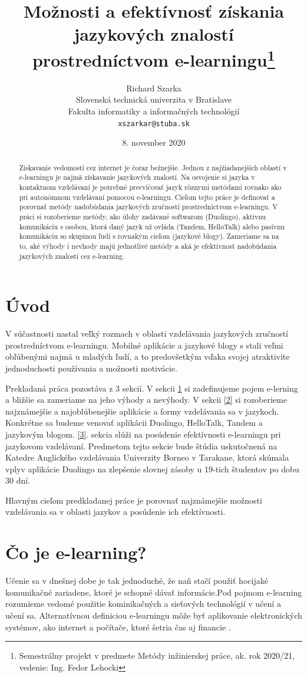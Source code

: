 \documentclass[10pt,oneside,slovak,a4paper]{article}
\title{Možnosti a efektívnosť získania jazykových znalostí prostredníctvom
e-learningu\thanks{Semestrálny projekt v predmete Metódy inžinierskej práce, ak. rok 2020/21, vedenie: Ing. Fedor Lehocki }} %
\author{Richard Szarka\\[2pt]
	{\small Slovenská technická univerzita v Bratislave}\\
	{\small Fakulta informatiky a informačných technológií}\\
	{\small \texttt{xszarkar@stuba.sk}}
	}
\date{\small 8. november 2020} %
\begin{document}
\maketitle

\begin{abstract}
Získavanie vedomostí cez internet je čoraz bežnejšie. Jednou z najžiadanejších oblastí v e-learningu je najmä získavanie jazykových znalostí. Na osvojenie si jazyka v kontaktnom vzdelávaní je potrebné precvičovať jazyk rôznymi metódami rovnako ako pri autonómnom vzdelávaní pomocou e-learningu. Cieľom tejto práce je definovať a porovnať metódy nadobúdania jazykových zručností prostredníctvom e-learningu. V práci si rozoberieme metódy, ako úlohy zadávané softwarom (Duolingo), aktívnu komunikáciu s osobou, ktorá daný jazyk už ovláda (Tandem, HelloTalk) alebo pasívnu komunikáciu so skupinou ľudí s rovnakým cieľom (jazykové blogy). Zameriame sa na to, aké výhody i nevhody majú jednotlivé metódy a aká je efektívnosť nadobúdania jazykových znalostí cez e-learning.
\end{abstract}

\section*{Úvod} %
V súčastnosti nastal veľký rozmach v oblasti vzdelávania jazykových zručností prostredníctvom e-learningu. Mobilné aplikácie a jazykové blogy s stali veľmi obľúbenými najmä u mladých ľudí, a to predovšetkým vďaka svojej atraktivite jednoduchosti používania a možnosti motivácie.

Prekladaná práca pozostáva z 3 sekcií. V sekcii \ref{1} si zadefinujeme pojem e-lerning a bližšie sa zameriame na jeho výhody a nevýhody. V sekcii \ref{2} si rozoberieme najznámejšie a najoblúbenejšie aplikácie a formy vzdelávania sa v jazykoch. Konkrétne sa budeme venovať aplikácii Duolingo, HelloTalk, Tandem a jazykovým blogom. \ref{3}. sekcia slúži na posúdenie efektívnosti  e-learningu pri jazykovom vzdelávaní. Predmetom tejto sekcie bude štúdia uskutočnená na Katedre Anglického vzdelávania Univerzity Borneo v Tarakane, ktorá skúmala vplyv aplikácie Duolingo na zlepšenie slovnej zásoby u 19-tich študentov po dobu 30 dní.

Hlavným cieľom predkladanej práce je porovnať najznámejšie možnosti vzdelávania sa v oblasti jazykov a posúdenie ich efektívnosti.

\section{Čo je e-learning?}%
\label{1}
Učenie sa v dnešnej dobe je tak jednoduché, že naň stačí použiť hocijaké komunikačné zariadene, ktoré je schopné dávať informácie\cite{vyhody}.Pod pojmom e-learning rozumieme vedomé použitie kominikačných a sieťových technológií v učení a učení sa. Alternatívnou definiciou e-learningu môže byť aplikovanie elektronických systémov, ako internet a počítače, ktoré šetria čas aj financie \cite{efektivnost}. 
\end{document}
